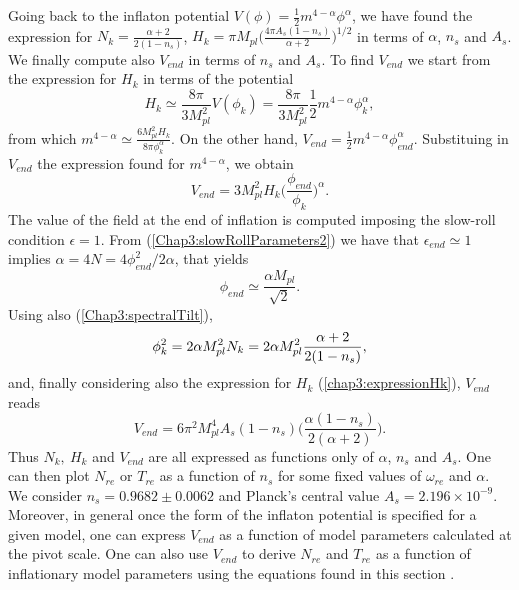 \documentclass[11pt,a4paper,twoside]{book}
\begin{document}
Going back to the inflaton potential $ V(\phi)=\frac{1}{2}m^{4-\alpha}\phi^{\alpha} $, we have found the expression for $ N_{k}=\frac{\alpha + 2 }{2(1-n_{s})} $, $ H_{k}=\pi M_{pl}\big(\frac{4\pi A_{s}(1-n_{s})}{\alpha +2}\big)^{1/2} $ in terms of $\alpha$, $ n_{s} $ and $ A_{s} $.
 We finally compute also $ V_{end} $ in terms of $ n_{s} $ and $ A_{s} $. To find $ V_{end} $ we start from the expression for $ H_{k} $ in terms of the potential
 \begin{equation}
\label{Chap3:HubblekPotential}
H_{k}\simeq  \frac{8\pi}{3M_{pl}^{2}}V(\phi_{k})= \frac{8\pi}{3M_{pl}^{2}}\frac{1}{2}m^{4-\alpha}\phi_{k}^{\alpha},
 \end{equation}
from which $ m^{4-\alpha} \simeq \frac{6M_{pl}^{2}H_{k}}{8\pi \phi_{k}^{\alpha}} $.
On the other hand, $ V_{end}=\frac{1}{2}m^{4-\alpha}\phi_{end}^{\alpha} $. Substituing in $ V_{end} $ the expression found for $ m^{4-\alpha} $, we obtain
\begin{equation}
	\label{Chap3:Vend}
	V_{end}=3M_{pl}^{2}H_{k}\Big(\frac{\phi_{end}}{\phi_{k}}\Big)^{\alpha}.
\end{equation}
The value of the field at the end of inflation is computed imposing the slow-roll condition $\epsilon = 1$. From (\ref{Chap3:slowRollParameters2}) we have that $\epsilon_{end}\simeq 1$ implies $\alpha = 4N= 4 \phi^{2}_{end}/2\alpha$, that yields
\begin{equation}
	\label{Chap3:phiEnd}
\phi_{end}\simeq\frac{\alpha M_{pl}}{\sqrt{2}}.
\end{equation}
Using also (\ref{Chap3:spectralTilt}),
\begin{equation}
\label{Chap3:expressionN_{k}}
\phi_{k}^{2}=2\alpha M_{pl}^{2}N_{k}=2\alpha M_{pl}^{2}\frac{\alpha + 2}{2(1-n_{s})},
\end{equation}
and, finally considering also the expression for $ H_{k} $ (\ref{chap3:expressionHk}), $ V_{end} $ reads
\begin{equation}
\label{Chap3:Vend2}
V_{end}=6\pi^{2}M_{pl}^{4}A_{s}(1-n_{s})\Bigg(\frac{\alpha(1-n_{s})}{2(\alpha+2)}\Bigg).
\end{equation}
Thus $ N_{k},\ H_{k}$ and $ V_{end} $ are all expressed as functions only of $ \alpha $, $ n_{s} $ and $ A_{s} $. One can then plot $ N_{re} $ or $ T_{re} $ as a function of $ n_{s} $ for some fixed values of $ \omega_{re} $ and $ \alpha $. We consider $ n_{s}=0.9682 \pm 0.0062 $ and Planck's central value $ A_{s}=2.196\times 10^{-9} $. Moreover, in general once the form of the inflaton potential is specified for a given model, one can express $ V_{end} $ as a function of model parameters calculated at the pivot scale. One can also use $ V_{end} $ to derive $ N_{re} $ and $ T_{re} $ as a function of inflationary model parameters using the equations found in this section \cite{Chap3:Cook}.
\end{document}

